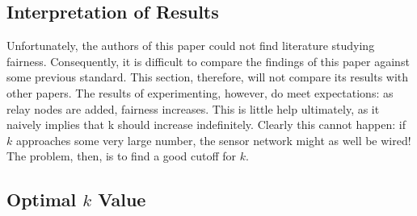 \subsection{Interpretation of Results}

Unfortunately, the authors of this paper could not find literature studying fairness.  Consequently, it is difficult to compare the findings of this paper against some previous standard.  This section, therefore, will not compare its results with other papers.  The results of experimenting, however, do meet expectations: as relay nodes are added, fairness increases.  This is little help ultimately, as it naively implies that k should increase indefinitely.  Clearly this cannot happen: if $k$ approaches some very large number, the sensor network might as well be wired!  The problem, then, is to find a good cutoff for $k$.

\subsection{Optimal $k$ Value}

